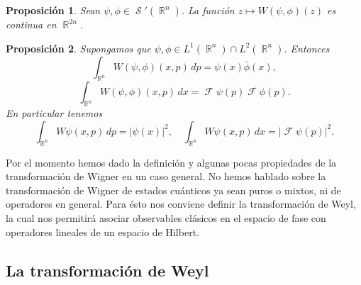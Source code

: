 \documentclass[a4paper]{report}
\DeclareMathOperator{\R}{\mathbb{R}}
\DeclareMathOperator{\Sz}{\mathcal S}
\DeclareMathOperator{\F}{\mathcal{F}}
\newtheorem{proposition}{Proposición}
\begin{document}
  \begin{proposition}
    Sean $\psi,\phi \in \Sz'(\R^{n})$. La función $z
    \mapsto W(\psi,\phi)(z)$ es continua en $\R^{2n}$.
  \end{proposition}

  \begin{proposition}
    Supongamos que $\psi, \phi \in L^{1}(\R^{n}) \cap
    L^2(\R^{n})$. Entonces
    \begin{equation}
      \int_{\R^{n}} W(\psi,\phi)(x,p) \, dp
      = \psi(x)\overline{\phi}(x),
    \end{equation}
    \begin{equation}
      \int_{\R^{n}} W(\psi,\phi)(x,p) \, dx
      = \F\psi(p) \overline{\F\phi}(p).
    \end{equation}
    En particular tenemos
    \begin{equation}
      \int_{\R^{n}} W\psi(x,p) \, dp
      = |\psi(x)|^2,
      \quad
      \int_{\R^{n}} W\psi(x,p) \, dx
      = |\F\psi(p)|^2.
    \end{equation}
  \end{proposition}
  Por el momento hemos dado la definición y algunas pocas
  propiedades de la transformación de Wigner en un caso
  general. No hemos hablado sobre la transformación de
  Wigner de estados cuánticos ya sean puros o mixtos, ni de
  operadores en general. Para ésto nos conviene definir la
  transformación de Weyl, la cual nos permitirá asociar
  observables clásicos en el espacio de fase con operadores
  lineales de un espacio de Hilbert.

  \subsection{La transformación de Weyl}
\end{document}
